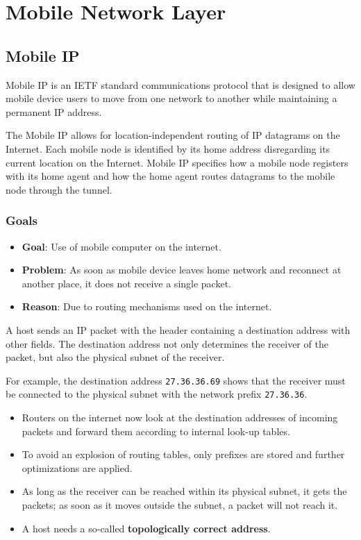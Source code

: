 
\chapter{Mobile Network Layer}

\section{Mobile IP}
Mobile IP is an IETF standard communications protocol that is designed to allow mobile device users to move from one network to another while maintaining a permanent IP address.

The Mobile IP allows for location-independent routing of IP datagrams on the Internet. Each mobile node is identified by its home address disregarding its current location on the Internet. Mobile IP specifies how a mobile node registers with its home agent and how the home agent routes datagrams to the mobile node through the tunnel.

\subsection{Goals}
\begin{itemize}
\item \textbf{Goal}: Use of mobile computer on the internet.
	\item \textbf{Problem}: As soon as mobile device leaves home network and reconnect at another place, it does not receive a single packet.
	\item \textbf{Reason}: Due to routing mechanisms used on the internet.
\end{itemize}

A host sends an IP packet with the header containing a destination address with other fields. The destination address not only determines the receiver of the packet, but also the physical subnet of the receiver. 

For example, the destination address \texttt{27.36.36.69} shows that the receiver must be connected to the physical subnet with the network prefix \texttt{27.36.36}. 
\begin{itemize}
	\item Routers on the internet now look at the destination addresses of incoming packets and forward them according to internal look-up tables. 
	\item To avoid an explosion of routing tables, only prefixes are stored and further optimizations are applied. 
	\item As long as the receiver can be reached within its physical subnet, it gets the packets; as soon as it moves outside the subnet, a packet will not reach it. 
	\item A host needs a so-called \textbf{topologically correct address}.
\end{itemize}
	
